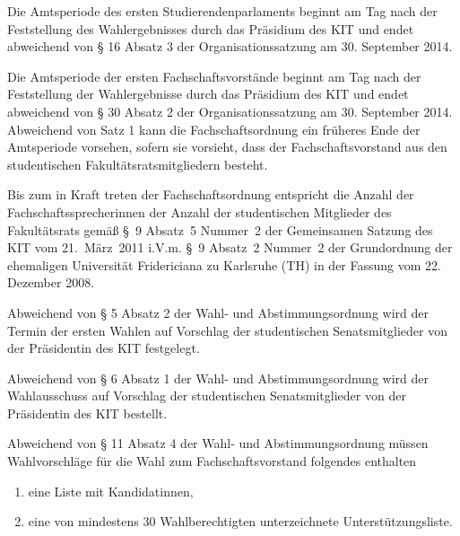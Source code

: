 

\begin{jurdoc}

\label{amtsperiode}
Die Amtsperiode des ersten Studierendenparlaments beginnt am Tag nach der Feststellung des Wahlergebnisses durch das Präsidium des KIT und endet abweichend von § 16 Absatz 3 der Organisationssatzung am 30. September 2014.

Die Amtsperiode der ersten Fachschaftsvorstände beginnt am Tag nach der Feststellung der Wahlergebnisse durch das Präsidium des KIT und endet abweichend von § 30 Absatz 2 der Organisationssatzung am 30. September 2014. Abweichend von Satz 1 kann die Fachschaftsordnung ein früheres Ende der Amtsperiode vorsehen, sofern sie vorsieht, dass der Fachschaftsvorstand aus den studentischen Fakultätsratsmitgliedern besteht.


\label{fachschaftssprecher}

Bis zum in Kraft treten der Fachschaftsordnung entspricht die Anzahl der Fachschaftssprecherinnen der Anzahl der studentischen Mitglieder des Fakultätsrats gemäß §~9 Absatz~5 Nummer~2 der Gemeinsamen Satzung des KIT vom 21.~März~2011 i.V.m. §~9 Absatz~2 Nummer~2 der Grundordnung der ehemaligen Universität Fridericiana zu Karlsruhe (TH) in der Fassung vom 22. Dezember 2008.


\label{wahlen}

Abweichend  von § 5 Absatz 2 der Wahl- und Abstimmungsordnung wird der Termin der ersten Wahlen auf Vorschlag der studentischen Senatsmitglieder von der Präsidentin des KIT festgelegt.

Abweichend von § 6 Absatz 1 der Wahl- und Abstimmungsordnung wird der Wahlausschuss auf Vorschlag der studentischen Senatsmitglieder von der Präsidentin des KIT bestellt.

Abweichend von § 11 Absatz 4 der Wahl- und Abstimmungsordnung müssen Wahlvorschläge für die Wahl zum Fachschaftsvorstand folgendes enthalten
\begin{enumerate}
\item eine Liste mit Kandidatinnen,
\item eine von mindestens 30 Wahlberechtigten unterzeichnete Unterstützungsliste.
\end{enumerate}


\end{jurdoc}
